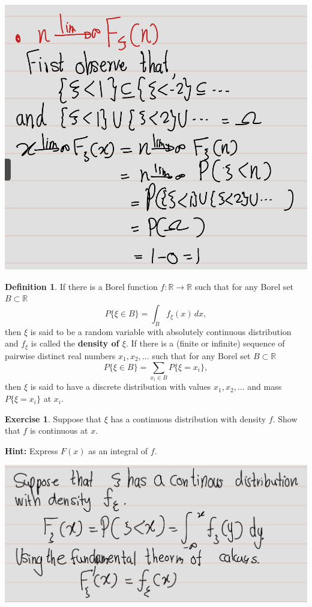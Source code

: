 \documentclass[
]{book}
\theoremstyle{definition}
\newtheorem{definition}{Definition}[chapter]
\theoremstyle{definition}
\theoremstyle{definition}
\newtheorem{exercise}{Exercise}[chapter]
\theoremstyle{definition}
\theoremstyle{remark}
\begin{document}
\includegraphics[width=18cm,height=\textheight]{fig/fig ex1.4-4.png}

\begin{definition}
\protect\hypertarget{def:unnamed-chunk-22}{}\label{def:unnamed-chunk-22}If there is a Borel function \(f: \mathbb{R} \to \mathbb{R}\) such that for any Borel set \(B \subset \mathbb{R}\)
\[
P\{\xi \in B\} = \int_B f_\xi(x) \, dx,
\]
then \(\xi\) is said to be a random variable with absolutely continuous distribution and \(f_\xi\) is called the \textbf{density of \(\xi\)}. If there is a (finite or infinite) sequence of pairwise distinct real numbers \(x_1, x_2, \ldots\) such that for any Borel set \(B \subset \mathbb{R}\)
\[
P\{\xi \in B\} = \sum_{x_i \in B} P\{\xi = x_i\},
\]
then \(\xi\) is said to have a discrete distribution with values \(x_1, x_2, \ldots\) and mass \(P\{\xi = x_i\}\) at \(x_i\).
\end{definition}

\begin{exercise}
\protect\hypertarget{exr:unnamed-chunk-23}{}\label{exr:unnamed-chunk-23}Suppose that \(\xi\) has a continuous distribution with density \(f\). Show that
\(f\) is continuous at \(x\).

\textbf{Hint:} Express \(F(x)\) as an integral of \(f\).
\end{exercise}

\includegraphics[width=18cm,height=\textheight]{fig/fig ex1.5.png}
\end{document}
